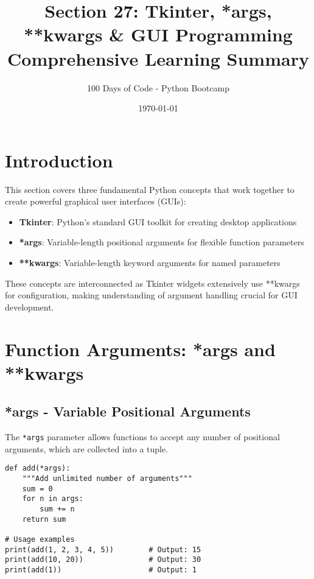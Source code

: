 \documentclass[12pt,a4paper]{article}
\title{\textbf{Section 27: Tkinter, *args, **kwargs \& GUI Programming}\\
\large{Comprehensive Learning Summary}}
\author{100 Days of Code - Python Bootcamp}
\date{\today}
\begin{document}
\maketitle
\newpage

\tableofcontents
\newpage

\section{Introduction}

This section covers three fundamental Python concepts that work together to create powerful graphical user interfaces (GUIs):

\begin{itemize}
    \item \textbf{Tkinter}: Python's standard GUI toolkit for creating desktop applications
    \item \textbf{*args}: Variable-length positional arguments for flexible function parameters
    \item \textbf{**kwargs}: Variable-length keyword arguments for named parameters
\end{itemize}

These concepts are interconnected as Tkinter widgets extensively use **kwargs for configuration, making understanding of argument handling crucial for GUI development.

\section{Function Arguments: *args and **kwargs}

\subsection{*args - Variable Positional Arguments}

The \texttt{*args} parameter allows functions to accept any number of positional arguments, which are collected into a tuple.

\begin{tcolorbox}[colback=blue!5!white,colframe=blue!75!black,title=*args Example]
\begin{lstlisting}
def add(*args):
    """Add unlimited number of arguments"""
    sum = 0
    for n in args:
        sum += n
    return sum

# Usage examples
print(add(1, 2, 3, 4, 5))        # Output: 15
print(add(10, 20))               # Output: 30
print(add(1))                    # Output: 1
\end{lstlisting}
\end{tcolorbox}
\end{document}
